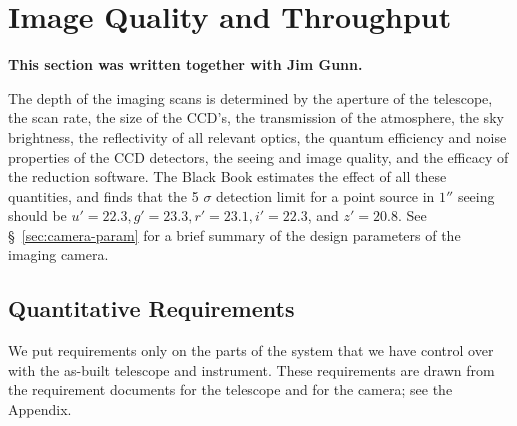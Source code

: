 \section{Image Quality and Throughput}
\label{sec:depth}

{\bf This section was written together with Jim Gunn. }

The depth of the imaging scans is determined by the aperture of
the telescope, the scan rate, the size of the CCD's, the transmission
of the atmosphere, the sky brightness, the reflectivity
of all relevant optics, the quantum efficiency and 
noise properties of the CCD detectors, the 
seeing and image quality, and the efficacy of the
reduction software.  The Black Book estimates the effect of all these
quantities, and finds that the 5
$\sigma$ detection limit for a point source in $1''$ seeing should be
$u' = 22.3, g' = 23.3, r' = 23.1, i' = 22.3$, and $z' = 20.8$.  See
\S~\ref{sec:camera-param} for a brief summary of the design parameters
of the imaging camera.  

\subsection{Quantitative Requirements}

We put requirements only on the parts of the system that we have control
over with the as-built telescope and instrument.  These requirements are
drawn from the requirement documents for the telescope and for the
camera; see the Appendix. 

